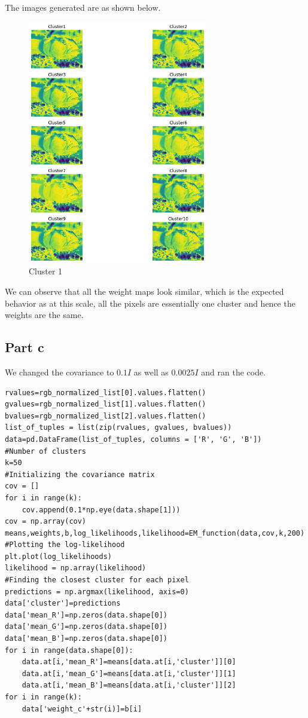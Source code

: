 \documentclass{article}      %
\begin{document}
The images generated are as shown below.

\begin{figure}[H]
\centering
\includegraphics[width=0.7\textwidth]{fish_wts_partb}
\caption{Cluster 1}
\end{figure}

We can observe that all the weight maps look similar, which is the expected behavior as at this scale, all the pixels are essentially one cluster and hence the weights are the same.

\subsection{Part c}

We changed the covariance to \(0.1 I\) as well as  \(0.0025 I\) and ran the code. 

\begin{lstlisting}
rvalues=rgb_normalized_list[0].values.flatten()
gvalues=rgb_normalized_list[1].values.flatten()
bvalues=rgb_normalized_list[2].values.flatten()
list_of_tuples = list(zip(rvalues, gvalues, bvalues))  
data=pd.DataFrame(list_of_tuples, columns = ['R', 'G', 'B'])
#Number of clusters
k=50
#Initializing the covariance matrix
cov = []
for i in range(k):
    cov.append(0.1*np.eye(data.shape[1]))
cov = np.array(cov)
means,weights,b,log_likelihoods,likelihood=EM_function(data,cov,k,200)
#Plotting the log-likelihood
plt.plot(log_likelihoods)
likelihood = np.array(likelihood)
#Finding the closest cluster for each pixel
predictions = np.argmax(likelihood, axis=0)
data['cluster']=predictions
data['mean_R']=np.zeros(data.shape[0])
data['mean_G']=np.zeros(data.shape[0])
data['mean_B']=np.zeros(data.shape[0])
for i in range(data.shape[0]):
    data.at[i,'mean_R']=means[data.at[i,'cluster']][0]
    data.at[i,'mean_G']=means[data.at[i,'cluster']][1]
    data.at[i,'mean_B']=means[data.at[i,'cluster']][2]
for i in range(k):
    data['weight_c'+str(i)]=b[i]
\end{lstlisting}
\end{document}
